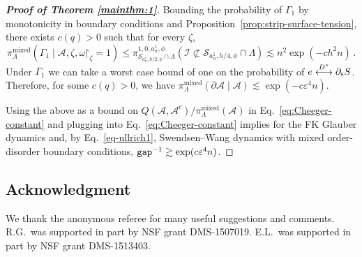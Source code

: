 \documentclass[reqno,11pt]{amsart}
\numberwithin{equation}{section}
\renewcommand{\restriction}{\mathord{\upharpoonright}}
\renewcommand{\epsilon}{\varepsilon}
\theoremstyle{definition}{
\newtheorem{example}[theorem]{Example}
\newtheorem{definition}[theorem]{Definition}
\newtheorem*{definition*}{Definition}
\newtheorem{problem}[theorem]{Problem}
\newtheorem{question}[theorem]{Question}
\newtheorem{remark}[theorem]{Remark}
}
\renewcommand{\epsilon}{\varepsilon}
\newcommand{\gap}{\text{\tt{gap}}}
\newcommand{\south}{{\textsc{s}}}
\newcommand{\alt}{{\mathrm{mixed}}}
\begin{document}
\begin{proof}[\emph{\textbf{Proof of Theorem \ref{mainthm:1}}}]
Bounding the probability of $\Gamma_1$ by monotonicity in boundary conditions and Proposition~\ref{prop:strip-surface-tension}, there exists $c(q)>0$ such that for every $\zeta$, 
\[\pi_{\Lambda}^{\alt}(\Gamma_1\mid \mathcal A,\zeta, \omega\restriction_{\zeta}=1)\leq \pi_{\mathcal S_{a_n^1,h/2,\phi}\cap \Lambda}^{1,0,a_n^1,\phi}(\mathcal I \not \subset \mathcal S_{a_n^1,h/4,\phi}\cap \Lambda)\lesssim n^2 \exp(-ch^2 n)\,.
\]
Under $\Gamma_1$ we can take a worst case bound of one on the probability of $e\stackrel{D^{\ast}}\longleftrightarrow \partial_\south S$. Therefore, for some $c(q)>0$, we have $\pi_{\Lambda}^{\alt} (\partial \mathcal A\mid \mathcal A)\lesssim \exp(-c\epsilon^4 n)$.

Using the above as a bound on $Q(\mathcal A,\mathcal A^c)/\pi_\Lambda^{\alt}(\mathcal A)$ in Eq.~\eqref{eq:Cheeger-constant} and plugging into Eq.~\eqref{eq:Cheeger-constant} implies for the FK Glauber dynamics and, by Eq.~\eqref{eq-ullrich1}, Swendsen--Wang dynamics with mixed order-disorder boundary conditions,  $\gap^{-1}\gtrsim \exp(c\epsilon^4 n)$. \end{proof}

\subsection*{Acknowledgment} We thank the anonymous referee for many useful suggestions and comments. R.G.\ was supported in part by NSF grant DMS-1507019. E.L.\ was supported in part by NSF grant DMS-1513403.



\end{document}
